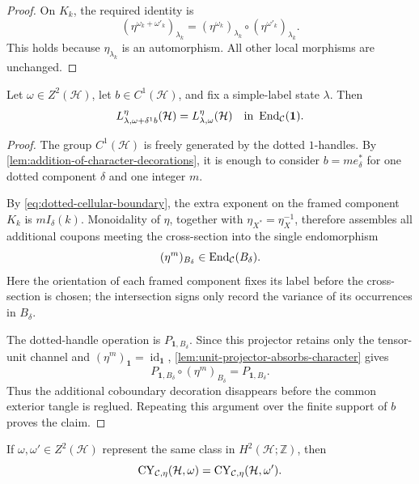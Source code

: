 \begin{proof}
On \(K_k\), the required identity is
\[
  (\eta^{\omega_k+\omega'_k})_{\lambda_k}
  =
  (\eta^{\omega_k})_{\lambda_k}
  \circ
  (\eta^{\omega'_k})_{\lambda_k}.
\]
This holds because \(\eta_{\lambda_k}\) is an automorphism.  All other local
morphisms are unchanged.
\end{proof}

\begin{proposition}
\label{prop:fixed-label-coboundary-triviality}
Let \(\omega\in Z^2(\mathcal H)\), let \(b\in C^1(\mathcal H)\), and fix a
simple-label state \(\lambda\).  Then
\[
  L^\eta_{\lambda,\omega+\delta^1b}(\mathcal H)
  =
  L^\eta_{\lambda,\omega}(\mathcal H)
  \quad\text{in }\operatorname{End}_{\mathcal{C}}(\mathbf1).
\]
\end{proposition}

\begin{proof}
The group \(C^1(\mathcal H)\) is freely generated by the dotted
\(1\)-handles.  By \cref{lem:addition-of-character-decorations}, it is enough
to consider \(b=m e_\delta^*\) for one dotted component \(\delta\) and one
integer \(m\).

By \eqref{eq:dotted-cellular-boundary}, the extra exponent on the framed
component \(K_k\) is \(mI_\delta(k)\).  Monoidality of \(\eta\), together
with \(\eta_{X^*}=\eta_X^{-1}\), therefore assembles all additional coupons
meeting the cross-section into the single endomorphism
\[
  (\eta^m)_{B_\delta}\in\operatorname{End}_{\mathcal{C}}(B_\delta).
\]
Here the orientation of each framed component fixes its label before the
cross-section is chosen; the intersection signs only record the variance of
its occurrences in \(B_\delta\).

The dotted-handle operation is \(P_{\mathbf1,B_\delta}\).  Since this
projector retains only the tensor-unit channel and
\((\eta^m)_{\mathbf1}=\operatorname{id}_{\mathbf1}\),
\cref{lem:unit-projector-absorbs-character} gives
\[
  P_{\mathbf1,B_\delta}\circ(\eta^m)_{B_\delta}
  =P_{\mathbf1,B_\delta}.
\]
Thus the additional coboundary decoration disappears before the common
exterior tangle is reglued.  Repeating this argument over the finite support
of \(b\) proves the claim.
\end{proof}

\begin{proposition}
\label{prop:representative-independence}
If \(\omega,\omega'\in Z^2(\mathcal H)\) represent the same class in
\(H^2(\mathcal H;\mathbb Z)\), then
\[
  \operatorname{CY}_{\mathcal{C},\eta}(\mathcal H,\omega)
  =
  \operatorname{CY}_{\mathcal{C},\eta}(\mathcal H,\omega').
\]
\end{proposition}

